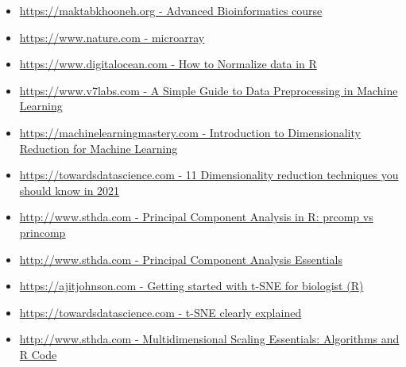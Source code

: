 \documentclass[11pt]{article}
\providecommand{\tightlist}{%
      \setlength{\itemsep}{0pt}\setlength{\parskip}{0pt}}
\begin{document}
\begin{itemize}
\tightlist
\item
  \href{https://maktabkhooneh.org/course/\%D8\%A8\%DB\%8C\%D9\%88\%D8\%A7\%D9\%86\%D9\%81\%D9\%88\%D8\%B1\%D9\%85\%D8\%A7\%D8\%AA\%DB\%8C\%DA\%A9-\%D9\%BE\%DB\%8C\%D8\%B4\%D8\%B1\%D9\%81\%D8\%AA\%D9\%87-mk375/\#seasons}{https://maktabkhooneh.org
  - Advanced Bioinformatics course}
\item
  \href{https://www.nature.com/scitable/definition/microarray-202/}{https://www.nature.com
  - microarray}
\item
  \href{https://www.digitalocean.com/community/tutorials/normalize-data-in-r}{https://www.digitalocean.com
  - How to Normalize data in R}
\item
  \href{https://www.v7labs.com/blog/data-preprocessing-guide}{https://www.v7labs.com
  - A Simple Guide to Data Preprocessing in Machine Learning}
\item
  \href{https://machinelearningmastery.com/dimensionality-reduction-for-machine-learning/}{https://machinelearningmastery.com
  - Introduction to Dimensionality Reduction for Machine Learning}
\item
  \href{https://towardsdatascience.com/11-dimensionality-reduction-techniques-you-should-know-in-2021-dcb9500d388b}{https://towardsdatascience.com
  - 11 Dimensionality reduction techniques you should know in 2021}
\item
  \href{http://www.sthda.com/english/articles/31-principal-component-methods-in-r-practical-guide/118-principal-component-analysis-in-r-prcomp-vs-princomp/}{http://www.sthda.com
  - Principal Component Analysis in R: prcomp vs princomp}
\item
  \href{http://www.sthda.com/english/articles/31-principal-component-methods-in-r-practical-guide/112-pca-principal-component-analysis-essentials/}{http://www.sthda.com
  - Principal Component Analysis Essentials}
\item
  \href{https://ajitjohnson.com/tsne-for-biologist-tutorial/}{https://ajitjohnson.com
  - Getting started with t-SNE for biologist (R)}
\item
  \href{https://towardsdatascience.com/t-sne-clearly-explained-d84c537f53a}{https://towardsdatascience.com
  - t-SNE clearly explained}
\item
  \href{http://www.sthda.com/english/articles/31-principal-component-methods-in-r-practical-guide/122-multidimensional-scaling-essentials-algorithms-and-r-code/}{http://www.sthda.com
  - Multidimensional Scaling Essentials: Algorithms and R Code}
\end{itemize}


    
    
    
\end{document}

